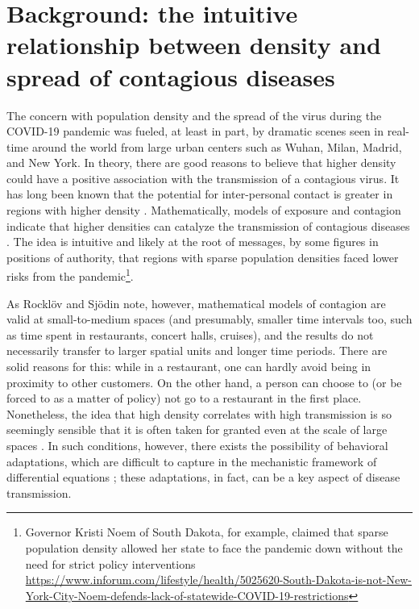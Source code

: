 \documentclass[preprint, 3p,
authoryear]{elsarticle} %
\begin{document}
\hypertarget{background-the-intuitive-relationship-between-density-and-spread-of-contagious-diseases}{%
\section{Background: the intuitive relationship between density and
spread of contagious
diseases}\label{background-the-intuitive-relationship-between-density-and-spread-of-contagious-diseases}}

The concern with population density and the spread of the virus during
the COVID-19 pandemic was fueled, at least in part, by dramatic scenes
seen in real-time around the world from large urban centers such as
Wuhan, Milan, Madrid, and New York. In theory, there are good reasons to
believe that higher density could have a positive association with the
transmission of a contagious virus. It has long been known that the
potential for inter-personal contact is greater in regions with higher
density \citep[see for example the research on urban fields and
time-geography,
including][]{Farber2011running, Moore1970urban, Moore1970some}.
Mathematically, models of exposure and contagion indicate that higher
densities can catalyze the transmission of contagious diseases
\citep{Rocklov2020high, Li2018effect}. The idea is intuitive and likely
at the root of messages, by some figures in positions of authority, that
regions with sparse population densities faced lower risks from the
pandemic\footnote{Governor Kristi Noem of South Dakota, for example,
  claimed that sparse population density allowed her state to face the
  pandemic down without the need for strict policy interventions
  \url{https://www.inforum.com/lifestyle/health/5025620-South-Dakota-is-not-New-York-City-Noem-defends-lack-of-statewide-COVID-19-restrictions}}.

As Rocklöv and Sjödin \citep{Rocklov2020high} note, however,
mathematical models of contagion are valid at small-to-medium spaces
(and presumably, smaller time intervals too, such as time spent in
restaurants, concert halls, cruises), and the results do not necessarily
transfer to larger spatial units and longer time periods. There are
solid reasons for this: while in a restaurant, one can hardly avoid
being in proximity to other customers. On the other hand, a person can
choose to (or be forced to as a matter of policy) not go to a restaurant
in the first place. Nonetheless, the idea that high density correlates
with high transmission is so seemingly sensible that it is often taken
for granted even at the scale of large spaces
\citep[e.g.,][]{Cruz2020exploring, Micallef2020first}. In such
conditions, however, there exists the possibility of behavioral
adaptations, which are difficult to capture in the mechanistic framework
of differential equations \citep[or can be missing in agent-based
models, e.g.,][]{Gomez2021infekta}; these adaptations, in fact, can be a
key aspect of disease transmission.
\end{document}
